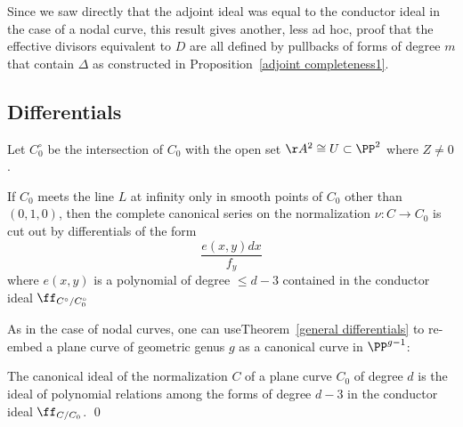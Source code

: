 Since we saw directly that the adjoint ideal was equal to the conductor ideal in the case of
a nodal curve, this result gives another, less ad hoc, proof that the effective divisors equivalent to $D$
are all defined by
pullbacks of forms of degree $m$ that contain $\Delta$
as constructed in Proposition~\ref{adjoint completeness1}.

\subsection{Differentials}

Let $C^\circ_0$ be the intersection of $C_0$ with the open set $\AA^{2}\cong U\subset \PP^{2}$ where $Z \neq 0$.

\begin{theorem}\label{general differentials}
If $C_{0}$ meets the line $L$ at infinity only in smooth points of $C_{0}$ other than $(0,1,0)$, then the complete canonical series on the normalization $\nu: C \to C_{0}$ is cut out by differentials of the form
$$
 \frac{e(x,y)dx}{f_{y}}
$$
where $e(x,y)$ is a polynomial of degree $\leq d-3$ contained in the 
conductor ideal $\ff_{C^{\circ}/C_{0}^{\circ}}$
\end{theorem}

As in the case of nodal curves, one can useTheorem~\ref{general differentials} to re-embed a plane curve of 
geometric genus $g$ as a canonical
curve in $\PP^{g-1}$:

\begin{corollary}
 The canonical ideal of the normalization $C$ of a plane curve $C_{0}$ of degree $d$ 
 is the ideal of polynomial relations
 among the forms of degree $d-3$ in the conductor ideal $\ff_{C/C_{0}}$. \qed
\end{corollary}

